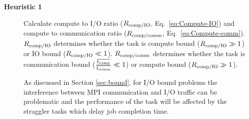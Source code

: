 \begin{description}
\item[\textbf{Heuristic 1}] Calculate compute to I/O ratio ($R_{\text{comp/IO}}$, Eq.~\ref{eq:Compute-IO}) and compute to communication ratio ($R_{\text{comp/comm}}$, Eq.~\ref{eq:Compute-comm}).
  $R_{\text{comp/IO}}$ determines whether the task is compute bound ($R_{\text{comp/IO}} \gg 1$) or IO bound ($R_{\text{comp/IO}} \ll 1$).
  $R_{\text{comp/comm}}$ determines whether the task is communication bound ($\frac{\overline{{t}_{\text{comp}}}}{\overline{t_{\text{comm}}}} \ll 1$) or compute bound ($R_{\text{comp/IO}} \gg 1$).

  As discussed in Section \ref{sec:bound}, for I/O bound problems the interference between MPI communication and I/O traffic can be problematic \cite{VMD2013, Brown:2018ab} and the performance of the task will be affected by the straggler tasks which delay job completion time.
  

\end{description}

